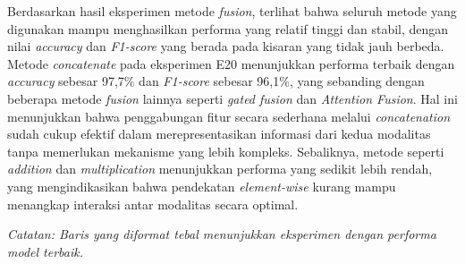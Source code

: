 Berdasarkan hasil eksperimen metode \textit{fusion}, terlihat bahwa seluruh metode yang digunakan mampu menghasilkan performa yang relatif tinggi dan stabil, dengan nilai \textit{accuracy} dan \textit{F1-score} yang berada pada kisaran yang tidak jauh berbeda. Metode \textit{concatenate} pada eksperimen E20 menunjukkan performa terbaik dengan \textit{accuracy} sebesar 97,7\% dan \textit{F1-score} sebesar 96,1\%, yang sebanding dengan beberapa metode \textit{fusion} lainnya seperti \textit{gated fusion} dan \textit{Attention Fusion}. Hal ini menunjukkan bahwa penggabungan fitur secara sederhana melalui \textit{concatenation} sudah cukup efektif dalam merepresentasikan informasi dari kedua modalitas tanpa memerlukan mekanisme yang lebih kompleks. Sebaliknya, metode seperti \textit{addition} dan \textit{multiplication} menunjukkan performa yang sedikit lebih rendah, yang mengindikasikan bahwa pendekatan \textit{element-wise} kurang mampu menangkap interaksi antar modalitas secara optimal.


\begin{table}[H]
    \centering
    \caption{Hasil Eksperimen Model Multimodal Metode \textit{Fusion}}
    \label{table:4.multimodal_fusion}
    \scriptsize
    \setlength{\tabcolsep}{2pt}
    \renewcommand{\arraystretch}{1.1}
    \smallskip
    \begin{flushleft}
    \footnotesize \textit{Catatan: Baris yang diformat tebal menunjukkan eksperimen dengan performa model terbaik.}
    \end{flushleft}
\end{table}


